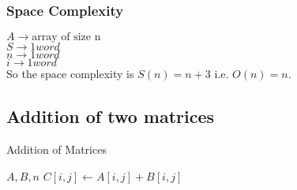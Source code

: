 \documentclass[]{article}
\begin{document}
\subsubsection{Space Complexity}
$A \rightarrow \text{array of size n}$ \\
$S \rightarrow 1 word$ \\
$n \rightarrow 1 word$ \\
$i \rightarrow 1 word$ \\
So the space complexity is $S(n) = n + 3$ i.e. $O(n) = n$.

\subsection{Addition of two matrices}
\noindent
\begin{algorithm}
    \caption{Addition of Matrices}\label{matadd}
    \begin{algorithmic}
     {$A, B, n$}
                \State $C[i, j] \gets A[i, j] + B[i, j]$ 
            \EndFor
        \EndFor
    \EndProcedure
    \end{algorithmic}
\end{algorithm}
\end{document}
